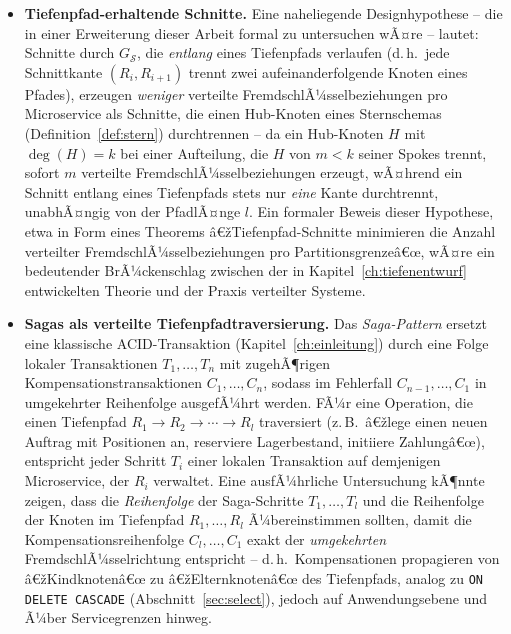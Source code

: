 ﻿\documentclass[a4paper,12pt]{report}
\theoremstyle{definition}
\theoremstyle{remark}
\begin{document}
\begin{itemize}
  \item \textbf{Tiefenpfad-erhaltende Schnitte.} Eine naheliegende
    Designhypothese -- die in einer Erweiterung dieser Arbeit formal
    zu untersuchen wÃ¤re -- lautet: Schnitte durch
    $G_{\mathcal{S}}$, die \emph{entlang} eines Tiefenpfads verlaufen
    (d.\,h.\ jede Schnittkante $(R_i,R_{i+1})$ trennt zwei
    aufeinanderfolgende Knoten eines Pfades), erzeugen
    \emph{weniger} verteilte FremdschlÃ¼sselbeziehungen pro
    Microservice als Schnitte, die einen Hub-Knoten eines
    Sternschemas (Definition~\ref{def:stern}) durchtrennen -- da ein
    Hub-Knoten $H$ mit $\deg(H)=k$ bei einer Aufteilung, die $H$ von
    $m<k$ seiner Spokes trennt, sofort $m$ verteilte
    FremdschlÃ¼sselbeziehungen erzeugt, wÃ¤hrend ein Schnitt entlang
    eines Tiefenpfads stets nur \emph{eine} Kante durchtrennt,
    unabhÃ¤ngig von der PfadlÃ¤nge $l$. Ein formaler Beweis dieser
    Hypothese, etwa in Form eines Theorems
    â€žTiefenpfad-Schnitte minimieren die Anzahl verteilter
    FremdschlÃ¼sselbeziehungen pro Partitionsgrenzeâ€œ, wÃ¤re ein
    bedeutender BrÃ¼ckenschlag zwischen der in
    Kapitel~\ref{ch:tiefenentwurf} entwickelten Theorie und der
    Praxis verteilter Systeme.

  \item \textbf{Sagas als verteilte Tiefenpfadtraversierung.} Das
    \emph{Saga-Pattern} ersetzt eine klassische ACID-Transaktion
    (Kapitel~\ref{ch:einleitung}) durch eine Folge lokaler
    Transaktionen $T_1,\ldots,T_n$ mit zugehÃ¶rigen
    Kompensationstransaktionen $C_1,\ldots,C_n$, sodass im Fehlerfall
    $C_{n-1},\ldots,C_1$ in umgekehrter Reihenfolge ausgefÃ¼hrt
    werden. FÃ¼r eine Operation, die einen Tiefenpfad
    $R_1\to R_2\to\cdots\to R_l$ traversiert (z.\,B.\ â€žlege einen
    neuen Auftrag mit Positionen an, reserviere Lagerbestand,
    initiiere Zahlungâ€œ), entspricht jeder Schritt $T_i$ einer
    lokalen Transaktion auf demjenigen Microservice, der $R_i$
    verwaltet. Eine ausfÃ¼hrliche Untersuchung kÃ¶nnte zeigen, dass die
    \emph{Reihenfolge} der Saga-Schritte $T_1,\ldots,T_l$ und die
    Reihenfolge der Knoten im Tiefenpfad $R_1,\ldots,R_l$
    Ã¼bereinstimmen sollten, damit die Kompensationsreihenfolge
    $C_l,\ldots,C_1$ exakt der \emph{umgekehrten}
    FremdschlÃ¼sselrichtung entspricht -- d.\,h.\ Kompensationen
    propagieren von â€žKindknotenâ€œ zu â€žElternknotenâ€œ des Tiefenpfads,
    analog zu \texttt{ON DELETE CASCADE} (Abschnitt~\ref{sec:select}),
    jedoch auf Anwendungsebene und Ã¼ber Servicegrenzen hinweg.


\end{itemize}
\end{document}
